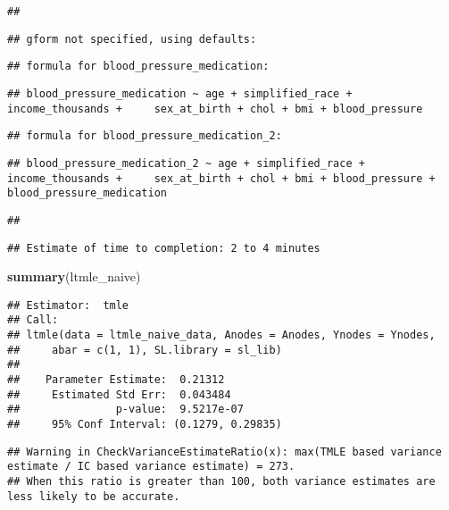 \documentclass[
]{article}
\newenvironment{Shaded}{\begin{snugshade}}{\end{snugshade}}
\newcommand{\FunctionTok}[1]{\textcolor[rgb]{0.13,0.29,0.53}{\textbf{#1}}}
\newcommand{\NormalTok}[1]{#1}
\begin{document}
\begin{verbatim}
## 
\end{verbatim}

\begin{verbatim}
## gform not specified, using defaults:
\end{verbatim}

\begin{verbatim}
## formula for blood_pressure_medication:
\end{verbatim}

\begin{verbatim}
## blood_pressure_medication ~ age + simplified_race + income_thousands +     sex_at_birth + chol + bmi + blood_pressure
\end{verbatim}

\begin{verbatim}
## formula for blood_pressure_medication_2:
\end{verbatim}

\begin{verbatim}
## blood_pressure_medication_2 ~ age + simplified_race + income_thousands +     sex_at_birth + chol + bmi + blood_pressure + blood_pressure_medication
\end{verbatim}

\begin{verbatim}
## 
\end{verbatim}

\begin{verbatim}
## Estimate of time to completion: 2 to 4 minutes
\end{verbatim}

\begin{Shaded}
\begin{Highlighting}[]
\FunctionTok{summary}\NormalTok{(ltmle\_naive)}
\end{Highlighting}
\end{Shaded}

\begin{verbatim}
## Estimator:  tmle 
## Call:
## ltmle(data = ltmle_naive_data, Anodes = Anodes, Ynodes = Ynodes, 
##     abar = c(1, 1), SL.library = sl_lib)
## 
##    Parameter Estimate:  0.21312 
##     Estimated Std Err:  0.043484 
##               p-value:  9.5217e-07 
##     95% Conf Interval: (0.1279, 0.29835)
\end{verbatim}

\begin{verbatim}
## Warning in CheckVarianceEstimateRatio(x): max(TMLE based variance estimate / IC based variance estimate) = 273.
## When this ratio is greater than 100, both variance estimates are less likely to be accurate.
\end{verbatim}
\end{document}
